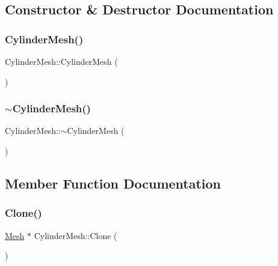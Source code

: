 \subsection{Constructor \& Destructor Documentation}
\mbox{\label{class_cylinder_mesh_a08927de34b86bf63103f8c3790ccf870}} 
\subsubsection{\texorpdfstring{CylinderMesh()}{CylinderMesh()}}
{\footnotesize\ttfamily Cylinder\+Mesh\+::\+Cylinder\+Mesh (\begin{DoxyParamCaption}{ }\end{DoxyParamCaption})}

\mbox{\label{class_cylinder_mesh_a0da5f97347f977bd0783f6674db3cba0}} 
\subsubsection{\texorpdfstring{$\sim$CylinderMesh()}{~CylinderMesh()}}
{\footnotesize\ttfamily Cylinder\+Mesh\+::$\sim$\+Cylinder\+Mesh (\begin{DoxyParamCaption}{ }\end{DoxyParamCaption})}



\subsection{Member Function Documentation}
\mbox{\label{class_cylinder_mesh_ad9e278dd523b06090b4e64f70a262575}} 
\subsubsection{\texorpdfstring{Clone()}{Clone()}}
{\footnotesize\ttfamily \mbox{\hyperlink{class_mesh}{Mesh}} $\ast$ Cylinder\+Mesh\+::\+Clone (\begin{DoxyParamCaption}{ }\end{DoxyParamCaption})\hspace{0.3cm}{\ttfamily [virtual]}}




